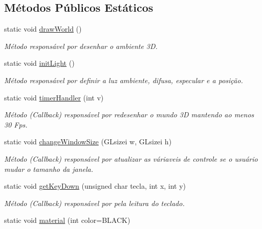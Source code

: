 \subsection*{Métodos Públicos Estáticos}
\begin{DoxyCompactItemize}
\item 
static void \hyperlink{classGraphics_ab65394158d2a2fa6a613fcb074ac808e}{draw\+World} ()
\begin{DoxyCompactList}\small\item\em Método responsável por desenhar o ambiente 3D. \end{DoxyCompactList}\item 
static void \hyperlink{classGraphics_a3549ba0484b18d43c6602fb0b57a29a6}{init\+Light} ()\hypertarget{classGraphics_a3549ba0484b18d43c6602fb0b57a29a6}{}\label{classGraphics_a3549ba0484b18d43c6602fb0b57a29a6}

\begin{DoxyCompactList}\small\item\em Método responsável por definir a luz ambiente, difusa, especular e a posição. \end{DoxyCompactList}\item 
static void \hyperlink{classGraphics_aa2795786eef8c99a7232a195992a9c82}{timer\+Handler} (int v)
\begin{DoxyCompactList}\small\item\em Método (Callback) responsável por redesenhar o mundo 3D mantendo ao menos 30 Fps. \end{DoxyCompactList}\item 
static void \hyperlink{classGraphics_a78ef6a0b1f6c142c9d650ffddfbaa2ed}{change\+Window\+Size} (G\+Lsizei w, G\+Lsizei h)\hypertarget{classGraphics_a78ef6a0b1f6c142c9d650ffddfbaa2ed}{}\label{classGraphics_a78ef6a0b1f6c142c9d650ffddfbaa2ed}

\begin{DoxyCompactList}\small\item\em Método (Callback) responsável por atualizar as váriaveis de controle se o usuário mudar o tamanho da janela. \end{DoxyCompactList}\item 
static void \hyperlink{classGraphics_a39214c3e7aa370ae703ca4b2fc7b6054}{get\+Key\+Down} (unsigned char tecla, int x, int y)\hypertarget{classGraphics_a39214c3e7aa370ae703ca4b2fc7b6054}{}\label{classGraphics_a39214c3e7aa370ae703ca4b2fc7b6054}

\begin{DoxyCompactList}\small\item\em Método (Callback) responsável por pela leitura do teclado. \end{DoxyCompactList}\item 
static void \hyperlink{classGraphics_ab3134b5ca29b658f4ac5cc12fa4b4705}{material} (int color=B\+L\+A\+CK)\hypertarget{classGraphics_ab3134b5ca29b658f4ac5cc12fa4b4705}{}\label{classGraphics_ab3134b5ca29b658f4ac5cc12fa4b4705}


\end{DoxyCompactItemize}
